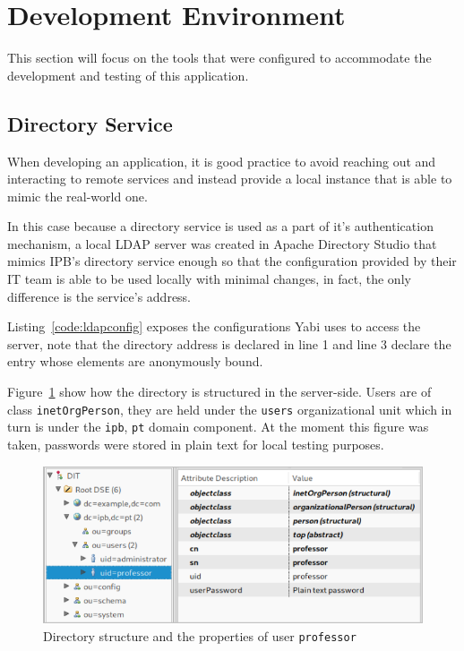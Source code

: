\section{Development Environment}\label{cha:implementation:sec:development}
This section will focus on the tools that were configured to accommodate the development and testing of this application.

\subsection{Directory Service}
When developing an application, it is good practice to avoid reaching out and interacting to remote services and instead provide a local instance that is able to mimic the real-world one.

In this case because a directory service is used as a part of it's authentication mechanism, a local \gls{LDAP} server was created in Apache Directory Studio that mimics \gls{IPB}'s directory service enough so that the configuration provided by their \gls{IT} team is able to be used locally with minimal changes, in fact, the only difference is the service's address.

Listing~\ref{code:ldapconfig} exposes the configurations \gls{Yabi} uses to access the server, note that the directory address is declared in line 1 and line 3 declare the entry whose elements are anonymously bound.



Figure~\ref{fig:adsconfig} show how the directory is structured in the server-side. Users are of class \texttt{inetOrgPerson}, they are held under the \texttt{users} organizational unit which in turn is under the \texttt{ipb}, \texttt{pt} domain component. At the moment this figure was taken, passwords were stored in plain text for local testing purposes.

\begin{figure}
  \centering
  \includegraphics[width=.8\textwidth]{images/screenshots/ldap-directory}
  \caption{Directory structure and the properties of user \texttt{professor}}\label{fig:adsconfig}
\end{figure}

